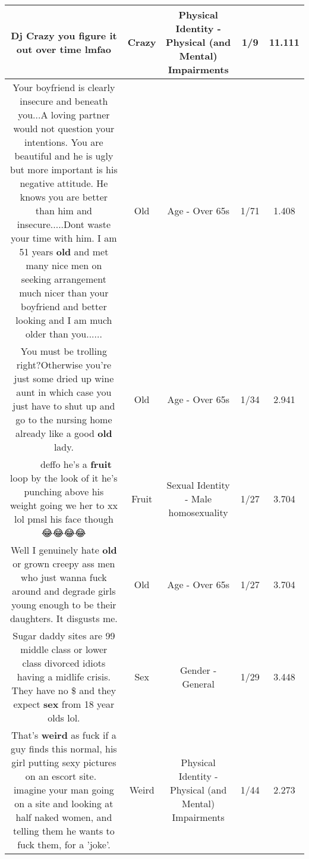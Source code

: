 \documentclass[11pt]{article}
\newlength\mylength
\begin{document}
\begin{center}
\begin{longtable}{|C{.65\mylength}|C{.30\mylength}|C{.12\mylength}|C{.12\mylength}|C{.12\mylength}|}
  \small Dj \textbf{Crazy} you figure it out over time lmfao\normalsize   & Crazy & Physical Identity - Physical (and Mental) Impairments & 1/9 & 11.111 \\  \hline
  \small Your boyfriend is clearly insecure and beneath you...A loving partner would not question your intentions.  You are beautiful and he is ugly but more important is his negative attitude.  He knows you are better than him and insecure.....Dont waste your time with him. I am 51 years \textbf{old} and met many nice men on seeking arrangement much nicer than your boyfriend and better looking and I am much older than you......\normalsize   & Old & Age - Over 65s & 1/71 & 1.408 \\  \hline
  \small You must be trolling right?Otherwise you're just some dried up wine aunt in which case you just have to shut up and go to the nursing home already like a good \textbf{old} lady.\normalsize   & Old & Age - Over 65s & 1/34 & 2.941 \\  \hline
  \small 🤣🤣🤣🤣🤣🤣🤣🤣 deffo  he's a \textbf{fruit} loop by the look of it he's punching above  his weight going we her to xx lol pmsl  his face though 😂😂😂😂\normalsize   & Fruit & Sexual Identity - Male homosexuality & 1/27 & 3.704 \\  \hline
  \small Well I genuinely hate \textbf{old} or grown creepy ass men who just wanna fuck around and degrade girls young enough to be their daughters. It disgusts me.\normalsize   & Old & Age - Over 65s & 1/27 & 3.704 \\  \hline
  \small Sugar daddy sites are 99 middle class or lower class divorced idiots having a midlife crisis. They have no \$ and they expect \textbf{sex} from 18 year olds lol.\normalsize   & Sex & Gender - General & 1/29 & 3.448 \\  \hline
  \small That's \textbf{weird} as fuck if a guy finds this normal, his girl putting sexy pictures on an escort site. 🤮 imagine your man going on a site and looking at half naked women, and telling them he wants to fuck them, for a 'joke'.\normalsize   & Weird & Physical Identity - Physical (and Mental) Impairments & 1/44 & 2.273 \\  \hline

\end{longtable}
\end{center}
\end{document}
